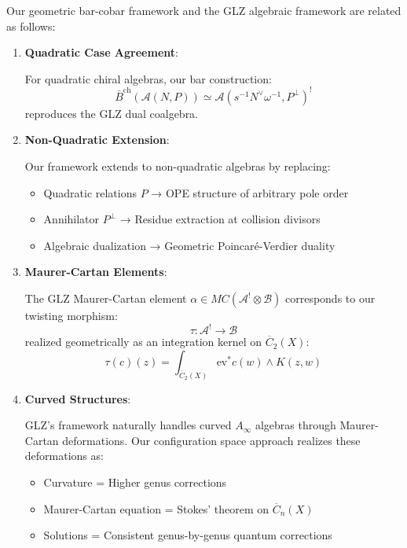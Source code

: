 \begin{theorem}
\label{thm:comparison-our-glz}
Our geometric bar-cobar framework and the GLZ algebraic framework are related as follows:

\begin{enumerate}
\item \textbf{Quadratic Case Agreement}:
   
   For quadratic chiral algebras, our bar construction:
   $$\bar{B}^{\text{ch}}(\mathcal{A}(N,P)) \simeq \mathcal{A}(s^{-1}N^{\vee}\omega^{-1}, P^{\perp})^!$$
   reproduces the GLZ dual coalgebra.

\item \textbf{Non-Quadratic Extension}:
   
   Our framework extends to non-quadratic algebras by replacing:
   \begin{itemize}
   \item Quadratic relations $P$ → OPE structure of arbitrary pole order
   \item Annihilator $P^{\perp}$ → Residue extraction at collision divisors
   \item Algebraic dualization → Geometric Poincaré-Verdier duality
   \end{itemize}

\item \textbf{Maurer-Cartan Elements}:
   
   The GLZ Maurer-Cartan element $\alpha \in MC(\mathcal{A}^! \otimes \mathcal{B})$ corresponds 
   to our twisting morphism:
   $$\tau: \mathcal{A}^! \to \mathcal{B}$$
   realized geometrically as an integration kernel on $\overline{C}_2(X)$:
   $$\tau(c)(z) = \int_{\overline{C}_2(X)} \text{ev}^* c(w) \wedge K(z, w)$$

\item \textbf{Curved Structures}:
   
   GLZ's framework naturally handles curved $A_{\infty}$ algebras through Maurer-Cartan 
   deformations. Our configuration space approach realizes these deformations as:
   \begin{itemize}
   \item Curvature = Higher genus corrections
   \item Maurer-Cartan equation = Stokes' theorem on $\overline{C}_n(X)$
   \item Solutions = Consistent genus-by-genus quantum corrections
   \end{itemize}
\end{enumerate}
\end{theorem}

